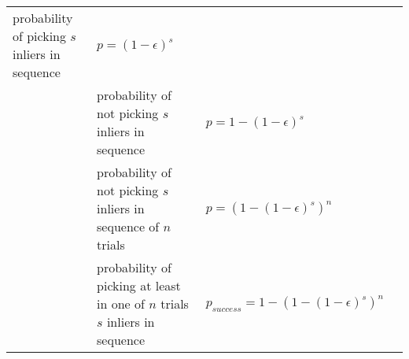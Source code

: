\documentclass[
]{article}
\newcommand{\columnA}{0.06}
\newcommand{\columnB}{0.18}
\newcommand{\columnC}{0.33}
\newcommand{\columnD}{0.33}
\begin{document}
\begin{longtable}[]{@{}llll@{}}
\begin{minipage}[t]{\columnB\columnwidth}
probability of picking \(s\) inliers in sequence\strut
\end{minipage} & \begin{minipage}[t]{\columnC\columnwidth}\raggedright
\(p=(1-\epsilon)^s\)\strut
\end{minipage} & \begin{minipage}[t]{\columnD\columnwidth}\raggedright
\strut
\end{minipage}\hline\tabularnewline
\begin{minipage}[t]{\columnA\columnwidth}\raggedright
\strut
\end{minipage} & \begin{minipage}[t]{\columnB\columnwidth}\raggedright
probability of not picking \(s\) inliers in sequence\strut
\end{minipage} & \begin{minipage}[t]{\columnC\columnwidth}\raggedright
\(p=1-(1-\epsilon)^s\)\strut
\end{minipage} & \begin{minipage}[t]{\columnD\columnwidth}\raggedright
\strut
\end{minipage}\hline\tabularnewline
\begin{minipage}[t]{\columnA\columnwidth}\raggedright
\strut
\end{minipage} & \begin{minipage}[t]{\columnB\columnwidth}\raggedright
probability of not picking \(s\) inliers in sequence of \(n\)
trials\strut
\end{minipage} & \begin{minipage}[t]{\columnC\columnwidth}\raggedright
\(p=(1-(1-\epsilon)^s)^n\)\strut
\end{minipage} & \begin{minipage}[t]{\columnD\columnwidth}\raggedright
\strut
\end{minipage}\hline\tabularnewline
\begin{minipage}[t]{\columnA\columnwidth}\raggedright
\strut
\end{minipage} & \begin{minipage}[t]{\columnB\columnwidth}\raggedright
probability of picking at least in one of \(n\) trials \(s\) inliers in
sequence\strut
\end{minipage} & \begin{minipage}[t]{\columnC\columnwidth}\raggedright
\(p_{success}=1-(1-(1-\epsilon)^s)^n\)\strut
\end{minipage} & \begin{minipage}[t]{\columnD\columnwidth}\raggedright

\end{minipage}
\end{longtable}
\end{document}
